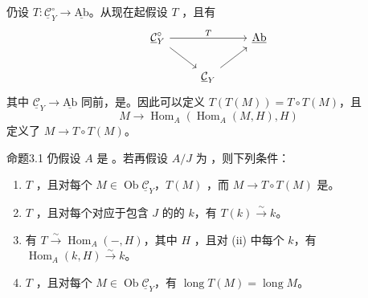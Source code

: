仍设 $T:\underline{\mathcal C}_Y^{\circ}\to\underline{\mathrm{Ab}}$。从现在起假设 $T$ ，且有
\[\begin{tikzcd}\underline{\mathcal C}_Y^{\circ}\arrow[rr,"T"]\arrow[dr]&&\underline{\mathrm{Ab}}\\&\underline{\mathcal C}_Y\arrow[ur]&\end{tikzcd}\]
其中 $\underline{\mathcal C}_Y\to\underline{\mathrm{Ab}}$ 同前，是。因此可以定义 $T(T(M))=T\circ T(M)$，且
\[M\longrightarrow\operatorname{Hom}_A(\operatorname{Hom}_A(M,H),H)\]
定义了 $M\to T\circ T(M)$。
\begin{SGAresult}{命题}{3.1}
仍假设 $A$ 是 。若再假设 $A/J$ 为 ，则下列条件：
\begin{enumerate}
\item[(i)] $T$ ，且对每个 $M\in\operatorname{Ob}\underline{\mathcal C}_Y$，$T(M)$ ，而 $M\to T\circ T(M)$ 是。
\item[(ii)] $T$ ，且对每个对应于包含 $J$ 的的 $k$，有 $T(k)\xrightarrow{\sim}k$。
\item[(iii)] 有 $T\xrightarrow{\sim}\operatorname{Hom}_A(-,H)$，其中 $H$ ，且对 (ii) 中每个 $k$，有 $\operatorname{Hom}_A(k,H)\xrightarrow{\sim}k$。
\item[(iv)] $T$ ，且对每个 $M\in\operatorname{Ob}\underline{\mathcal C}_Y$，有 $\operatorname{long}T(M)=\operatorname{long}M$。
\end{enumerate}
\end{SGAresult}
